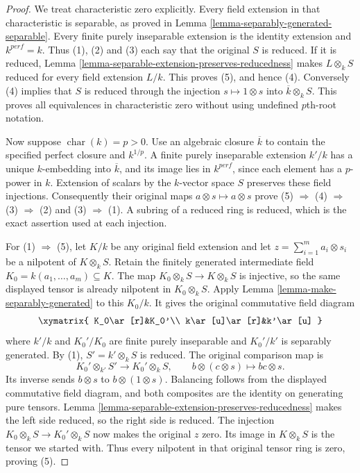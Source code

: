 \begin{proof}
We treat characteristic zero explicitly. Every field
extension in that characteristic is separable, as
proved in Lemma \ref{lemma-separably-generated-separable}.
Every finite purely inseparable extension is the
identity extension and $k^{perf}=k$. Thus (1), (2)
and (3) each say that the original $S$ is reduced.
If it is reduced, Lemma
\ref{lemma-separable-extension-preserves-reducedness}
makes $L\otimes_k S$ reduced for every field
extension $L/k$. This proves (5), and hence (4).
Conversely (4) implies that $S$ is reduced through
the injection $s\mapsto1\otimes s$ into
$\overline k\otimes_k S$. This proves all equivalences
in characteristic zero without using undefined
$p$th-root notation.

Now suppose $\operatorname{char}(k)=p>0$. Use an
algebraic closure $\overline k$ to contain the
specified perfect closure and $k^{1/p}$. A finite
purely inseparable extension $k'/k$ has a unique
$k$-embedding into $\overline k$, and its image lies
in $k^{perf}$, since each element has a $p$-power
in $k$. Extension of scalars by the $k$-vector
space $S$ preserves these field injections.
Consequently their original maps
$a\otimes s\mapsto a\otimes s$ prove
(5) $\Rightarrow$ (4) $\Rightarrow$ (3) $\Rightarrow$ (2)
and (3) $\Rightarrow$ (1). A subring of a reduced
ring is reduced, which is the exact assertion
used at each injection.

For (1) $\Rightarrow$ (5), let $K/k$ be any original
field extension and let $z=\sum_{i=1}^m a_i\otimes s_i$
be a nilpotent of $K\otimes_k S$. Retain the
finitely generated intermediate field
$K_0=k(a_1,\ldots,a_m)\subseteq K$. The map
$K_0\otimes_k S\to K\otimes_k S$ is injective,
so the same displayed tensor is already nilpotent
in $K_0\otimes_k S$. Apply Lemma
\ref{lemma-make-separably-generated} to this $K_0/k$.
It gives the original commutative field diagram
$$
\xymatrix{
K_0\ar[r]&K_0'\\
k\ar[u]\ar[r]&k'\ar[u]
}
$$
where $k'/k$ and $K_0'/K_0$ are finite purely
inseparable and $K_0'/k'$ is separably generated.
By (1), $S'=k'\otimes_k S$ is reduced. The original
comparison map is
$$
K_0'\otimes_{k'}S'\longrightarrow K_0'\otimes_k S,
\qquad b\otimes(c\otimes s)\longmapsto bc\otimes s.
$$
Its inverse sends $b\otimes s$ to
$b\otimes(1\otimes s)$. Balancing follows from
the displayed commutative field diagram, and
both composites are the identity on generating
pure tensors. Lemma
\ref{lemma-separable-extension-preserves-reducedness}
makes the left side reduced, so the right side
is reduced. The injection
$K_0\otimes_k S\to K_0'\otimes_k S$ now makes
the original $z$ zero. Its image in $K\otimes_k S$
is the tensor we started with. Thus every
nilpotent in that original tensor ring is zero,
proving (5).


\end{proof}
